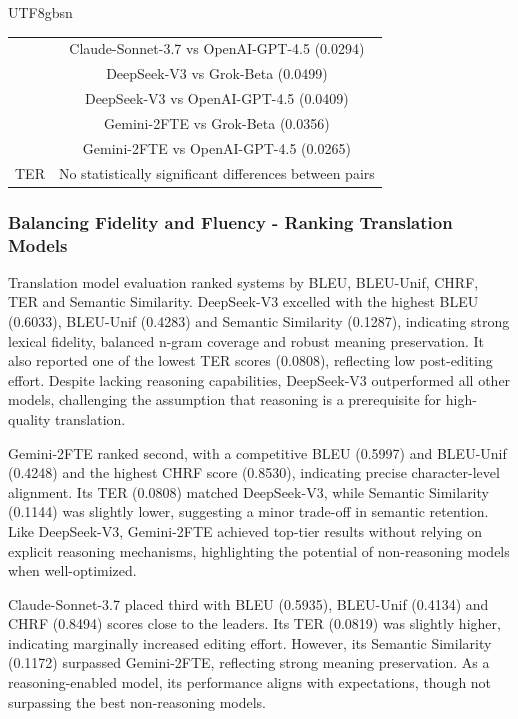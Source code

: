 \documentclass[conference]{IEEEtran}
\begin{document}
\begin{CJK}{UTF8}{gbsn}
\begin{table}[h]
\begin{tabular}{cc}
                                             & Claude-Sonnet-3.7 vs OpenAI-GPT-4.5 (0.0294) \\
                                             & DeepSeek-V3 vs Grok-Beta (0.0499) \\
                                             & DeepSeek-V3 vs OpenAI-GPT-4.5 (0.0409) \\
                                             & Gemini-2FTE vs Grok-Beta (0.0356) \\
                                             & Gemini-2FTE vs OpenAI-GPT-4.5 (0.0265) \\
        \hline
        TER & No statistically significant differences between pairs \\
        \hline
    \end{tabular}
\end{table}


\subsubsection{Balancing Fidelity and Fluency - Ranking Translation Models}

Translation model evaluation ranked systems by BLEU, BLEU-Unif, CHRF, TER and Semantic Similarity. DeepSeek-V3 excelled with the highest BLEU (0.6033), BLEU-Unif (0.4283) and Semantic Similarity (0.1287), indicating strong lexical fidelity, balanced n-gram coverage and robust meaning preservation. It also reported one of the lowest TER scores (0.0808), reflecting low post-editing effort. Despite lacking reasoning capabilities, DeepSeek-V3 outperformed all other models, challenging the assumption that reasoning is a prerequisite for high-quality translation.

Gemini-2FTE ranked second, with a competitive BLEU (0.5997) and BLEU-Unif (0.4248) and the highest CHRF score (0.8530), indicating precise character-level alignment. Its TER (0.0808) matched DeepSeek-V3, while Semantic Similarity (0.1144) was slightly lower, suggesting a minor trade-off in semantic retention. Like DeepSeek-V3, Gemini-2FTE achieved top-tier results without relying on explicit reasoning mechanisms, highlighting the potential of non-reasoning models when well-optimized.

Claude-Sonnet-3.7 placed third with BLEU (0.5935), BLEU-Unif (0.4134) and CHRF (0.8494) scores close to the leaders. Its TER (0.0819) was slightly higher, indicating marginally increased editing effort. However, its Semantic Similarity (0.1172) surpassed Gemini-2FTE, reflecting strong meaning preservation. As a reasoning-enabled model, its performance aligns with expectations, though not surpassing the best non-reasoning models.


\end{CJK}
\end{document}
